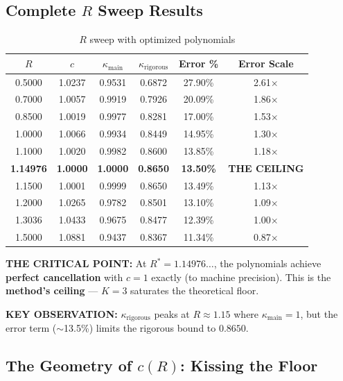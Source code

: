 \documentclass[11pt]{article}
\begin{document}
\subsection{Complete $R$ Sweep Results}

\begin{table}[h]
\centering
\caption{$R$ sweep with optimized polynomials}
\begin{tabular}{cccccc}
\toprule
$R$ & $c$ & $\kappa_{\text{main}}$ & $\kappa_{\text{rigorous}}$ & Error \% & Error Scale \\
\midrule
0.5000 & 1.0237 & 0.9531 & 0.6872 & 27.90\% & 2.61$\times$ \\
0.7000 & 1.0057 & 0.9919 & 0.7926 & 20.09\% & 1.86$\times$ \\
0.8500 & 1.0019 & 0.9977 & 0.8281 & 17.00\% & 1.53$\times$ \\
1.0000 & 1.0066 & 0.9934 & 0.8449 & 14.95\% & 1.30$\times$ \\
1.1000 & 1.0020 & 0.9982 & 0.8600 & 13.85\% & 1.18$\times$ \\
\rowcolor{yellow!30} \textbf{1.14976} & \textbf{1.0000} & \textbf{1.0000} & \textbf{0.8650} & \textbf{13.50\%} & \textbf{THE CEILING} \\
1.1500 & 1.0001 & 0.9999 & 0.8650 & 13.49\% & 1.13$\times$ \\
1.2000 & 1.0265 & 0.9782 & 0.8501 & 13.10\% & 1.09$\times$ \\
1.3036 & 1.0433 & 0.9675 & 0.8477 & 12.39\% & 1.00$\times$ \\
1.5000 & 1.0881 & 0.9437 & 0.8367 & 11.34\% & 0.87$\times$ \\
\bottomrule
\end{tabular}
\end{table}

\textbf{THE CRITICAL POINT:} At $R^* = 1.14976\ldots$, the polynomials achieve \textbf{perfect cancellation} with $c = 1$ exactly (to machine precision). This is the \textbf{method's ceiling} --- $K=3$ saturates the theoretical floor.

\textbf{KEY OBSERVATION:} $\kappa_{\text{rigorous}}$ peaks at $R \approx 1.15$ where $\kappa_{\text{main}} = 1$, but the error term ($\sim$13.5\%) limits the rigorous bound to $0.8650$.

\subsection{The Geometry of $c(R)$: Kissing the Floor}
\end{document}
